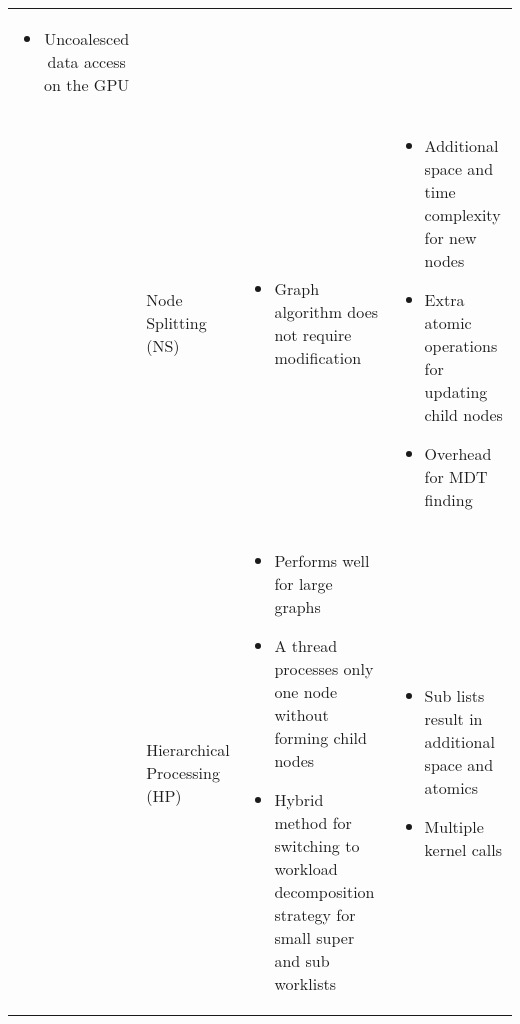 \begin{table*}
\begin{tabular}{|c|p{1.45in}|p{2.45in}|p{2.55in}|}
{\begin{itemize}
   \item  Uncoalesced data access on the GPU
  \end{itemize}
  } \\ \cline{2-4}
  &
  Node Splitting (NS) & 
  \parbox{2.5in}{
   \begin{itemize}
	\item Graph algorithm does not require modification
   \end{itemize} 
  } &
  \parbox{2.5in}{
  \begin{itemize} 
   \item Additional space and time complexity for new nodes
   \item Extra atomic operations for updating child nodes
   \item  Overhead for MDT finding
  \end{itemize}
  } \\ 
  &
  Hierarchical Processing (HP) & 
  \parbox{2.5in}{
  \begin{itemize}
   \item Performs well for large graphs
   \item  A thread processes only one node without forming child nodes
   \item  Hybrid method for switching to workload decomposition strategy for small super and sub worklists
  \end{itemize}
  } & 
  \parbox{2.5in}{
  \begin{itemize}
   \item Sub lists result in additional space and atomics
   \item Multiple kernel calls
  \end{itemize}
  } \\ \hline\hline
 \end{tabular}
 \label{strategies-summary}
\end{table*}



